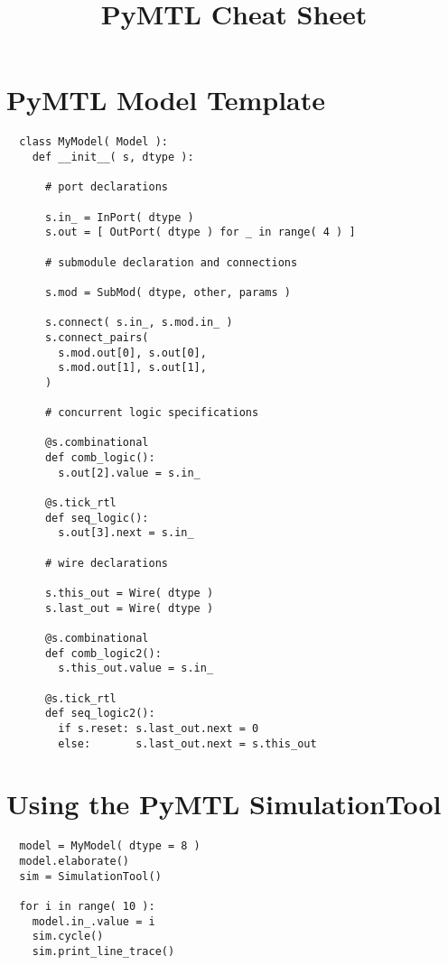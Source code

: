\documentclass{cbxdoc}
\title{PyMTL Cheat Sheet}
\begin{document}


\maketitle
\bigskip


\section{PyMTL Model Template}

\begin{verbatim}
  class MyModel( Model ):
    def __init__( s, dtype ):

      # port declarations

      s.in_ = InPort( dtype )
      s.out = [ OutPort( dtype ) for _ in range( 4 ) ]

      # submodule declaration and connections

      s.mod = SubMod( dtype, other, params )

      s.connect( s.in_, s.mod.in_ )
      s.connect_pairs(
        s.mod.out[0], s.out[0],
        s.mod.out[1], s.out[1],
      )

      # concurrent logic specifications

      @s.combinational
      def comb_logic():
        s.out[2].value = s.in_

      @s.tick_rtl
      def seq_logic():
        s.out[3].next = s.in_

      # wire declarations

      s.this_out = Wire( dtype )
      s.last_out = Wire( dtype )

      @s.combinational
      def comb_logic2():
        s.this_out.value = s.in_

      @s.tick_rtl
      def seq_logic2():
        if s.reset: s.last_out.next = 0
        else:       s.last_out.next = s.this_out
\end{verbatim}

\clearpage

\section{Using the PyMTL SimulationTool}
\begin{verbatim}
  model = MyModel( dtype = 8 ) 
  model.elaborate()
  sim = SimulationTool()

  for i in range( 10 ):
    model.in_.value = i
    sim.cycle()
    sim.print_line_trace()
\end{verbatim}
\end{document}
